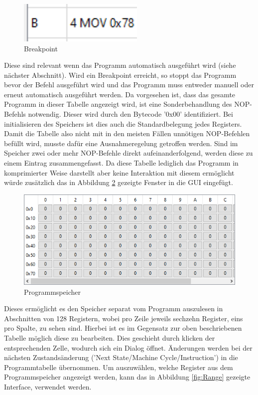 \documentclass[12pt]{article}
\newcommand{\imgSpaceBefore}{\vspace{10pt}}
\begin{document}
\begin{figure}[h]
\centering
\includegraphics[width=6cm]{bilder/Breakpoint}
\caption{Breakpoint}
\label{fig:Break}
\end{figure}

\noindent
Diese sind relevant wenn das Programm automatisch ausgeführt wird (siehe nächster Abschnitt). Wird ein Breakpoint erreicht, so stoppt das Programm bevor der Befehl ausgeführt wird und das Programm muss entweder manuell oder erneut automatisch ausgeführt werden. Da vorgesehen ist, dass das gesamte Programm in dieser Tabelle angezeigt wird, ist eine Sonderbehandlung des NOP-Befehls notwendig. Dieser wird durch den Bytecode '0x00' identifiziert. Bei initialisieren des Speichers ist dies auch die Standardbelegung jedes Registers. Damit die Tabelle also nicht mit in den meisten Fällen unnötigen NOP-Befehlen befüllt wird, musste dafür eine Ausnahmeregelung getroffen werden. Sind im Speicher zwei oder mehr NOP-Befehle direkt aufeinanderfolgend, werden diese zu einem Eintrag zusammengefasst. Da diese Tabelle lediglich das Programm in komprimierter Weise darstellt aber keine Interaktion mit diesem ermöglicht würde zusätzlich das in Abbildung \ref{fig:ProgSpeicher} gezeigte Fenster in die GUI eingefügt.\imgSpaceBefore

\begin{figure}[H]
\centering
\includegraphics[width=12cm]{bilder/ProgramMemory}
\caption{Programmspeicher}
\label{fig:ProgSpeicher}
\end{figure}

\noindent
Dieses ermöglicht es den Speicher separat vom Programm auszulesen in Abschnitten von 128 Registern, wobei pro Zeile jeweils sechzehn Register, eins pro Spalte, zu sehen sind. Hierbei ist es im Gegensatz zur oben beschriebenen Tabelle möglich diese zu bearbeiten. Dies geschieht durch klicken der entsprechenden Zelle, wodurch sich ein Dialog öffnet. Änderungen werden bei der nächsten Zustandsänderung ('Next State/Machine Cycle/Instruction') in die Programmtabelle übernommen. Um auszuwählen, welche Register aus dem Programmspeicher angezeigt werden, kann das in Abbildung \ref{fig:Range} gezeigte Interface, verwendet werden.\imgSpaceBefore
\end{document}
